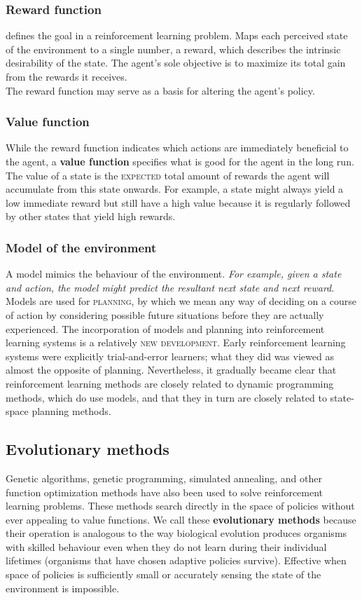 \documentclass[11pt]{article}
\begin{document}
\subsubsection*{Reward function}
defines the goal in a reinforcement learning problem. Maps each perceived state of the environment to a single number, a reward, which describes the intrinsic desirability of the state. The agent's sole objective is to maximize its total gain from the rewards it receives.\\
The reward function may serve as a basis for altering the agent's policy.

\subsubsection*{Value function}
While the reward function indicates which actions are immediately beneficial to the agent, a \textbf{value function} specifies what is good for the agent in the long run. The value of a state is the \textsc{expected} total amount of rewards the agent will accumulate from this state onwards.
For example, a state might always yield a low immediate reward but still have a high value because it is regularly followed by other states that yield high rewards.

\subsubsection*{Model of the environment}
A model mimics the behaviour of the environment. \textit{For example, given a state and action, the model might predict the resultant next state and next reward}. Models are used for \textsc{planning}, by which we mean any way of deciding on a course of action by considering possible future situations before they are actually experienced. The incorporation of models and planning into reinforcement learning systems is a relatively \textsc{new development}. Early reinforcement learning systems were explicitly trial-and-error learners; what they did was viewed as almost the opposite of planning. Nevertheless, it gradually became clear that reinforcement learning methods are closely related to dynamic programming methods, which do use models, and that they in turn are closely related to state-space planning methods. 

\subsection{Evolutionary methods}
Genetic algorithms, genetic programming, simulated annealing, and other function optimization methods have also been used to solve reinforcement learning problems. These methods search directly in the space of policies without ever appealing to value functions. We call these \textbf{evolutionary methods} because their operation is analogous to the way biological evolution produces organisms with skilled behaviour even when they do not learn during their individual lifetimes (organisms that have chosen adaptive policies survive). Effective when space of policies is sufficiently small or accurately sensing the state of the environment is impossible.
\end{document}
